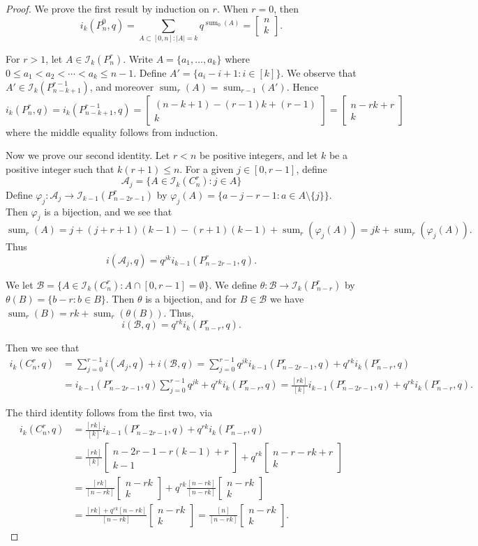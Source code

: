 \documentclass[10pt,a4paper]{amsart}
\newcommand{\gau}[2]{\left[ \begin{array}{c} #1 \\ #2 \end{array} \right]}
\DeclareMathOperator{\ssum}{sum}
\begin{document}
\begin{proof}
 We prove the first result by induction on $r$. 
 When $r=0$, then \[i_k(P_n^0,q) = \sum_{A \subset [0,n]: |A| = k} q^{\ssum_0(A)} = \gau{n}{k}. \]

For $r > 1$, let $A \in \mathcal{I}_k(P^r_n).$ Write $A = \{a_1, \ldots, a_k\}$ where $0 \leq a_1 < a_2 < \cdots < a_k \leq n-1.$ 
Define $A' = \{a_i - i+1: i \in [k] \}$. We observe that $A' \in \mathcal{I}_{k}(P_{n-k+1}^{r-1})$, and moreover $\ssum_r(A) = \ssum_{r-1}(A').$ Hence \[i_k(P_n^r,q) = i_k(P_{n-k+1}^{r-1},q) = \gau{(n-k+1)-(r-1)k+(r-1)}{k} = \gau{n-rk+r}{k}\] 
where the middle equality follows from induction. 

Now we prove our second identity.
Let $r < n$ be positive integers, and let $k$ be a positive integer such that $k(r+1) \leq n$. 
For a given $j \in [0,r-1]$, define
\[\mathcal{A}_j = \{A \in \mathcal{I}_k(C_n^r): j \in A \} \]
Define $\varphi_j: \mathcal{A}_j \to \mathcal{I}_{k-1}(P_{n-2r-1}^r)$ by $\varphi_j(A) = \{a - j-r-1: a \in A \setminus \{j\} \}$. Then $\varphi_j$ is a bijection, and we see that 
\[\ssum_r(A) = j+(j+r+1)(k-1) - (r+1)(k-1) + \ssum_r(\varphi_j(A)) = jk + \ssum_r(\varphi_j(A)).\] 
Thus \[i(\mathcal{A}_j,q) = q^{jk} i_{k-1}(P_{n-2r-1}^r,q) .\]

We let $\mathcal{B} = \{A \in \mathcal{I}_k(C_n^r): A \cap [0,r-1] = \emptyset \}$. We define $\theta:\mathcal{B} \to \mathcal{I}_k(P_{n-r}^r)$ by 
$\theta(B) = \{b - r: b \in B \}$. Then $\theta$ is a bijection, and for $B \in \mathcal{B}$ we have $\ssum_r(B) = rk + \ssum_r(\theta(B))$.
Thus, \[i(\mathcal{B},q) = q^{rk} i_k(P_{n-r}^r,q) .\]

Then we see that 
\begin{align*} i_k(C_n^r,q)  & =  \sum_{j=0}^{r-1} i(\mathcal{A}_j,q)  +  i(\mathcal{B},q) 
 =  \sum_{j=0}^{r-1} q^{jk} i_{k-1}(P_{n-2r-1}^r,q)  +  q^{rk}i_k(P_{n-r}^r,q) \\ 
 & =  i_{k-1}(P_{n-2r-1}^r,q)\sum_{j=0}^{r-1} q^{jk}  +  q^{rk}i_k(P_{n-r}^r,q)  
 =  \frac{[rk]}{[k]} i_{k-1}(P_{n-2r-1}^r,q)  +  q^{rk}i_k(P_{n-r}^r,q). \end{align*}

The third identity follows from the first two, via
\begin{align*}
i_k(C_n^r, q) & =  \frac{[rk]}{[k]} i_{k-1}(P_{n-2r-1}^r,q)  +  q^{rk}i_k(P_{n-r}^r,q) \\
 & =  \frac{[rk]}{[k]}\gau{n-2r-1-r(k-1)+r}{k-1}  +  q^{rk}\gau{n-r-rk+r}{k} \\
& =  \frac{[rk]}{[n-rk]}\gau{n-rk}{k}  +  q^{rk}\frac{[n-rk]}{[n-rk]}\gau{n-rk}{k}  \\
 & =  \frac{[rk]+q^{rk}[n-rk]}{[n-rk]}\gau{n-rk}{k}  =   \frac{[n]}{[n-rk]}\gau{n-rk}{k}.
\end{align*}
\end{proof}
\end{document}
